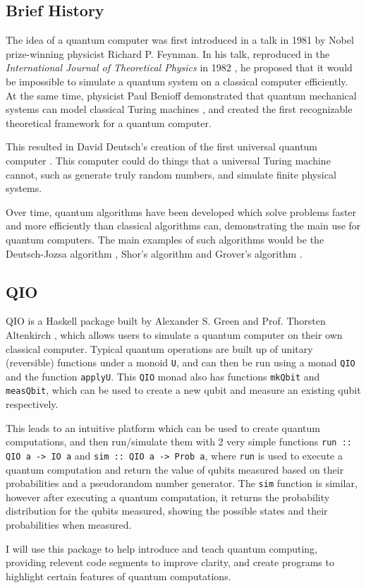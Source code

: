 \documentclass[a4paper,10pt, titlepage, twoside]{article}
\begin{document}
\subsection{Brief History}
The idea of a quantum computer was first introduced in a talk in 1981 by Nobel prize-winning physicist Richard P. Feynman. In his talk, reproduced in the \textit{International Journal of Theoretical Physics} in 1982 \cite{feynman}, he proposed that it would be impossible to simulate a quantum system on a classical computer efficiently. At the same time, physicist Paul Benioff demonstrated that quantum mechanical systems can model classical Turing machines \cite{benioff}, and created the first recognizable theoretical framework for a quantum computer. \par
This resulted in David Deutsch's creation of the first universal quantum computer \cite{deutsch}. This computer could do things that a universal Turing machine cannot, such as generate truly random numbers, and simulate finite physical systems. \par
Over time, quantum algorithms have been developed which solve problems faster and more efficiently than classical algorithms can, demonstrating the main use for quantum computers. The main examples of such algorithms would be the Deutsch-Jozsa algorithm  \cite{deutsch-jozsa}, Shor's algorithm \cite{shor} and Grover's algorithm \cite{grover}.

\subsection{QIO}
QIO is a Haskell package built by Alexander S. Green and Prof. Thorsten Altenkirch \cite{qio}, which allows users to simulate a quantum computer on their own classical computer. Typical quantum operations are built up of unitary (reversible) functions under a monoid \texttt{U}, and can then be run using a monad \texttt{QIO} and the function \texttt{applyU}. This \texttt{QIO} monad also has functions \texttt{mkQbit} and \texttt{measQbit}, which can be used to create a new qubit and measure an existing qubit respectively.\par
This leads to an intuitive platform which can be used to create quantum computations, and then run/simulate them with 2 very simple functions \texttt{run :: QIO a -> IO a}  and \texttt{sim :: QIO a -> Prob a}, where \texttt{run} is used to execute a quantum computation and return the value of qubits measured based on their probabilities and a pseudorandom number generator. The \texttt{sim} function is similar, however after executing a quantum computation, it returns the probability distribution for the qubits measured, showing the possible states and their probabilities when measured.\par
I will use this package to help introduce and teach quantum computing, providing relevent code segments to improve clarity, and create programs to highlight certain features of quantum computations.
\end{document}
